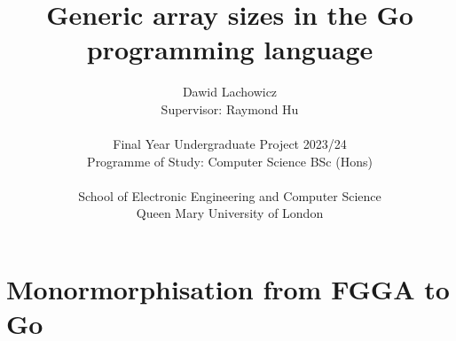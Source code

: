 \documentclass[12pt]{article}
\title{Generic array sizes in the Go programming language}
\author{
    Dawid Lachowicz \\ 
    Supervisor: Raymond Hu \\ 
    \\
    Final Year Undergraduate Project 2023/24 \\
    Programme of Study: Computer Science BSc (Hons) \\
    \\
    School of Electronic Engineering and Computer Science \\
    Queen Mary University of London
}
\begin{document}
\maketitle
\clearpage


\clearpage

\tableofcontents
\clearpage


\clearpage


\clearpage


\clearpage


\clearpage


\clearpage


\clearpage

\section{Monormorphisation from FGGA to Go}

\clearpage


\clearpage

\printbibliography
\clearpage

\appendix

\clearpage


\clearpage


\clearpage


\end{document}
